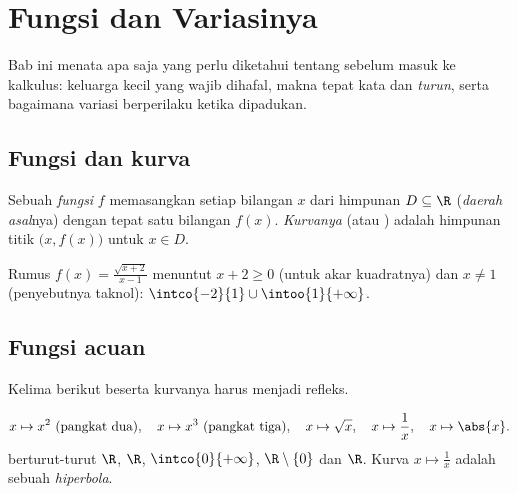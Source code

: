 \chapter{Fungsi dan Variasinya}\label{ch:g11:func}

Bab ini menata apa saja yang perlu diketahui tentang  sebelum masuk
ke kalkulus: keluarga kecil \emph{} yang  wajib
dihafal, makna tepat kata \emph{} dan
\emph{turun}, serta bagaimana variasi berperilaku ketika  dipadukan.

\section{Fungsi dan kurva}

\begin{definition}\label{def:g11:func:function}
Sebuah \emph{fungsi} $f$ memasangkan setiap bilangan $x$ dari
himpunan $D \subseteq \R$ (\emph{daerah asal}nya) dengan
tepat satu bilangan $f(x)$. \emph{Kurvanya} (atau ) adalah himpunan
titik $\bigl(x, f(x)\bigr)$ untuk $x \in D$.
\end{definition}

\begin{example}
Rumus $f(x) = \frac{\sqrt{x+2}}{x-1}$ menuntut $x + 2 \geq 0$ (untuk
akar kuadratnya) dan $x \neq 1$ (penyebutnya taknol): 
$\intco{-2}{1} \cup \intoo{1}{+\infty}$.
\end{example}

\section{Fungsi acuan}

Kelima  berikut beserta kurvanya harus menjadi refleks.

\begin{definition}\label{def:g11:func:reference}
\[
x \mapsto x^2 \text{ (pangkat dua)}, \quad
x \mapsto x^3 \text{ (pangkat tiga)}, \quad
x \mapsto \sqrt{x}, \quad
x \mapsto \frac{1}{x}, \quad
x \mapsto \abs{x}.
\]
 berturut-turut $\R$, $\R$, $\intco{0}{+\infty}$,
$\R \setminus \{0\}$ dan $\R$. Kurva $x \mapsto \frac1x$ adalah sebuah
\emph{hiperbola}.
\end{definition}

